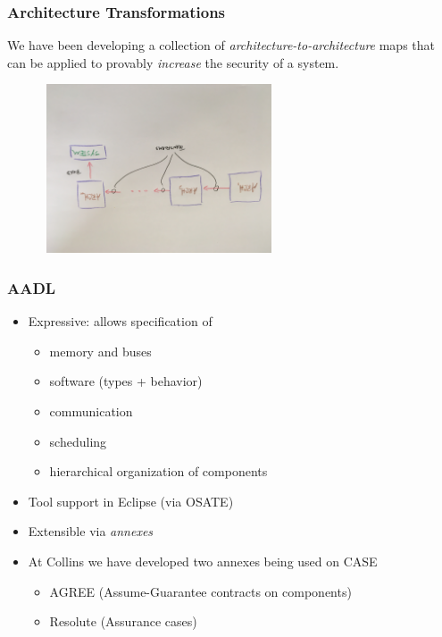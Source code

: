 \documentclass{beamer}
\begin{document}
\begin{frame}\frametitle{Architecture Transformations}

We have been developing a collection of
\emph{architecture-to-architecture} maps that can be applied to
provably \emph{increase} the security of a system.

\includegraphics[width=90mm,height=50mm]{arch-trans.jpg}

\end{frame}

\begin{frame}\frametitle{AADL}

\begin {itemize}
\item Expressive: allows specification of
\begin{itemize}
     \item memory and buses
     \item software (types + behavior)
     \item communication
     \item scheduling
     \item  hierarchical organization of components
\end{itemize}
\item Tool support in Eclipse (via OSATE)
\item Extensible via \emph{annexes}
\item At Collins we have developed two annexes being used on CASE
\begin{itemize}
\item AGREE  (Assume-Guarantee contracts on components)
\item Resolute (Assurance cases)
\end{itemize}
\end{itemize}
\end{frame}
\end{document}
